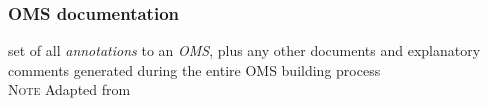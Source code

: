 \documentclass[10pt,%
\ifpretendfinal
final%
\else
draft%
\fi,
]{scrreprt}
\makeatletter
\newcommand*\CommentAuthor{}
\renewcommand*\CommentAuthor{#1}}
\newcommand*\CommentDate{}
\renewcommand*\CommentDate{#1}}
\newcommand*\CommentId{}
\renewcommand*\CommentId{#1}}
\newcommand*\CommentType{}
\renewcommand*\CommentType{#1}}
\newcommand*{\SetCommentColorByType}[1]{%
\edef\localType{{#1}}%
\expandafter\ifstrequal\localType{q-aut}{\colorlet{CommentColor}{red}}{%
\expandafter\ifstrequal\localType{q-all}{\colorlet{CommentColor}{orange}}{%
\expandafter\ifstrequal\localType{todo}{\colorlet{CommentColor}{orange}}{%
\expandafter\ifstrequal\localType{fyi}{\colorlet{CommentColor}{lightgray}}{%
\colorlet{CommentColor}{yellow}}}}}}
\newcommand*{\SetCommentPrefixByType}[1]{%
\edef\localType{{#1}}%
\expandafter\@ifmtarg\localType{%
\edef\CommentPrefix{}%
}{%
\caseupper[q]{#1}%
\edef\CommentPrefix{\thestring: }%
}}
\newcommand*{\initComment}[1]{%
\setkeys{Comment}{#1}%
\SetCommentColorByType{\CommentType}%
\relax%
\SetCommentPrefixByType{\CommentType}%
\relax%
}
\newcommand*{\todonote}[2][]{%
\initComment{#1}%
\pdfcomment[author=\CommentAuthor,color=CommentColor,date=\CommentDate,id=\CommentId]{%
\CommentPrefix
#2}}
\renewcommand*{\todonote}[2][]{%
\initComment{#1}%
\ednote{\CommentPrefix #2}}
\newcommand*{\termref}[1]{\textit{#1}}
\newcommand{\termdefinition}[2]{\subsubsection*{\normalsize #1}#2}
\newcommand{\nisref}[1]{#1}
\newenvironment{definitions}[0]{\medskip }{}
\newenvironment{note}[0]{\ \\ \textsc{Note} \quad}{}
\makeatother
\begin{document}
\begin{definitions}
  
  
  
 

  \termdefinition{OMS documentation}{set of all \termref{annotations} to an \termref{OMS}, plus any other documents and explanatory comments generated during the entire OMS building process}
  \begin{note}
    Adapted from \cite{SuarezFigueroaEtAl:OntologyGlossary2008}
  \end{note}
\end{definitions}
\end{document}
